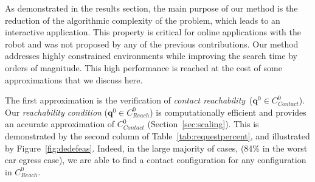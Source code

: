 \documentclass[journal]{IEEEtran}
\newcommand{\contactreachability}{\textit{contact reachability}}	%
\newcommand{\gls}[1]{\textit{#1}}
\providecommand{\DIFaddtex}[1]{#1} %
\providecommand{\DIFdeltex}[1]{} %
\providecommand{\DIFaddbegin}{\protect\color{blue}} %
\providecommand{\DIFaddend}{\protect\color{black}} %
\providecommand{\DIFdelbegin}{\protect\cbdelete} %
\providecommand{\DIFdelend}{} %
\providecommand{\DIFadd}[1]{\texorpdfstring{\DIFaddtex{#1}}{#1}} %
\providecommand{\DIFdel}[1]{\texorpdfstring{\DIFdeltex{#1}}{}} %
\begin{document}

As demonstrated in the results section, the main \DIFdelbegin \DIFdel{interest }\DIFdelend \DIFaddbegin \DIFadd{purpose }\DIFaddend of our method is the reduction of the algorithmic complexity of the problem, which leads to an interactive 
application. This property is critical for 
online applications with the robot and was not proposed by any of the previous contributions. Our method addresses highly constrained environments while improving the search time by orders of magnitude. This high performance is reached at the cost of some approximations that we discuss here. 

The first approximation is the verification of \contactreachability\ ($\mathbf{q}^0 \in C_{Contact}^0$).  Our \textit{reachability condition} ($\mathbf{q}^0 \in C_{Reach}^0$) is computationally efficient and provides an accurate approximation of $C_{Contact}^0$ (Section~\ref{sec:scaling}). This is demonstrated by the second column of Table~\ref{tab:requestpercent}, and illustrated by Figure~\ref{fig:dedefeas}. Indeed, in the large majority of cases, (84\% in the worst car egress case), we are able to find a contact configuration for any configuration in $C_{Reach}^0$.

\end{document}
